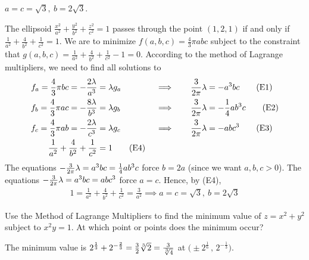 \begin{answer}
$a=c=\sqrt{3},\ b=2\sqrt{3}$.
\end{answer}

\begin{solution}
The ellipsoid $\frac{x^2}{a^2}+\frac{y^2}{b^2}+\frac{z^2}{c^2}=1$ passes 
through the point $(1,2,1)$ if and only if 
$\frac{1}{a^2}+\frac{4}{b^2}+\frac{1}{c^2}=1$.
We are to minimize  $f(a,b,c)=\frac{4}{3}\pi abc$ subject to the constraint 
that $g(a,b,c) = \frac{1}{a^2}+\frac{4}{b^2}+\frac{1}{c^2} -1=0$.
According to the method of Lagrange multipliers, we need to find 
all solutions to
\begin{alignat*}{7}
f_a = \frac{4}{3}\pi bc = -\frac{2\lambda}{a^3}  &= \lambda g_a 
      \quad&&\implies\quad && \frac{3}{2\pi}\lambda=-a^3bc \tag{E1} \\ 
f_b = \frac{4}{3}\pi ac = - \frac{8\lambda}{b^3} &= \lambda g_b 
      \quad&&\implies\quad && \frac{3}{2\pi}\lambda=-\frac{1}{4}ab^3c \tag{E2} \\ 
f_c = \frac{4}{3}\pi ab = -\frac{2\lambda}{c^3} &= \lambda g_c 
       \quad&&\implies\quad && \frac{3}{2\pi}\lambda=-abc^3 \tag{E3} \\ 
\frac{1}{a^2}+\frac{4}{b^2}+\frac{1}{c^2}&=1 \tag{E4}
\end{alignat*}
The equations $-\frac{3}{2\pi}\lambda=a^3bc=\frac{1}{4}ab^3c$ force $b=2a$
(since we want $a,b,c>0$). The equations $-\frac{3}{2\pi}\lambda=a^3bc=abc^3$ force 
$a=c$. Hence, by (E4), 
\begin{align*}
1=\frac{1}{a^2}+\frac{4}{b^2}+\frac{1}{c^2}=\frac{3}{a^2}
\implies a=c=\sqrt{3},\ b=2\sqrt{3}
\end{align*}
\end{solution}


\begin{question}[M200 2005D] %
Use the Method of Lagrange Multipliers to find the minimum value of 
$z = x^2 + y^2$ subject to $x^2 y = 1$. At which point or points
does the minimum occur?
\end{question}

%

\begin{answer}
The minimum value is 
$2^{\frac{1}{3}} + 2^{-\frac{2}{3}}
       =\frac{3}{2}\root{3}\of{2}
       =\frac{3}{\sqrt[3]{4}}$ at
$\big(\pm 2^{\frac{1}{6}}\,,\, 2^{-\frac{1}{3}}\big)$.
\end{answer}

